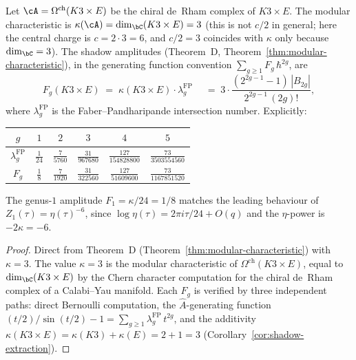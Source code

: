 \begin{proposition}
\label{prop:shadow-k3e}
Let $\cA = \Omega^{\mathrm{ch}}(K3 \times E)$ be the chiral
de~Rham complex of $K3 \times E$. The modular characteristic
is $\kappa(\cA) = \dim_\bC(K3 \times E) = 3$
\textup{(}this is not $c/2$ in general; here the central charge is
$c = 2 \cdot 3 = 6$, and $c/2 = 3$ coincides with $\kappa$
only because $\dim_\bC = 3$\textup{)}.
The shadow amplitudes \textup{(}Theorem~D,
Theorem~\textup{\ref{thm:modular-characteristic})}, in the
generating function convention $\sum_{g \geq 1} F_g\,\hbar^{2g}$,
are
\begin{equation}\label{eq:shadow-k3e}
F_g(K3 \times E) \;=\; \kappa(K3 \times E) \cdot \lambda_g^{\mathrm{FP}} \quad \;=\; 3 \cdot \frac{(2^{2g-1}-1)\,|B_{2g}|}{2^{2g-1}\,(2g)!},
\end{equation}
where $\lambda_g^{\mathrm{FP}}$ is the Faber--Pandharipande
intersection number. Explicitly:
\begin{center}
\small
\renewcommand{\arraystretch}{1.2}
\begin{tabular}{cccccc}
$g$ & $1$ & $2$ & $3$ & $4$ & $5$ \\
\hline
$\lambda_g^{\mathrm{FP}}$ & $\frac{1}{24}$ & $\frac{7}{5760}$
 & $\frac{31}{967680}$ & $\frac{127}{154828800}$
 & $\frac{73}{3503554560}$ \\[4pt]
$F_g$ & $\frac{1}{8}$ & $\frac{7}{1920}$
 & $\frac{31}{322560}$ & $\frac{127}{51609600}$
 & $\frac{73}{1167851520}$
\end{tabular}
\end{center}
The genus-$1$ amplitude $F_1 = \kappa/24 = 1/8$ matches the
leading behaviour of $Z_1(\tau) = \eta(\tau)^{-6}$, since
$\log\eta(\tau) = 2\pi i \tau / 24 + O(q)$ and the
$\eta$-power is $-2\kappa = -6$.
\end{proposition}

\begin{proof}
Direct from Theorem~D
(Theorem~\ref{thm:modular-characteristic})
with $\kappa = 3$. The value $\kappa = 3$ is the modular
characteristic of $\Omega^{\mathrm{ch}}(K3 \times E)$,
equal to $\dim_\bC(K3 \times E)$ by the Chern character
computation for the chiral de~Rham complex of a Calabi--Yau
manifold. Each $F_g$ is verified by three independent
paths: direct Bernoulli computation, the $\hat{A}$-generating
function $(t/2)/\sin(t/2) - 1 = \sum_{g \geq 1}
\lambda_g^{\mathrm{FP}}\,t^{2g}$, and the additivity
$\kappa(K3 \times E) = \kappa(K3) + \kappa(E) = 2 + 1 = 3$
(Corollary~\ref{cor:shadow-extraction}).
\end{proof}

